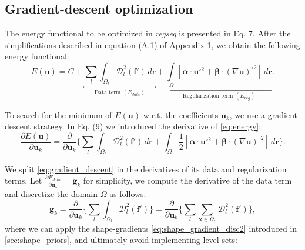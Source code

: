 \documentclass[a4paper]{report}
\providecommand{\mdist}[2]{ \mathcal{D}_{#2}^2(\mathbf{#1}) }
\renewcommand{\vec}[1]{\mathbf{#1}}
\begin{document}
\subsection{Gradient-descent optimization}\label{sec:gradient_descent}
The energy functional to be optimized in \emph{regseg} is presented in Eq. 7.
After the simplifications described in equation (A.1) of Appendix 1, we obtain the
  following energy functional:
  \begin{equation}
  E(\vec{u}) = C + \underbracket{\underset{l}{\sum} \int_{\Omega_l}
  \mdist{f'}{l} \,d\vec{r}}_{\text{Data term } (E_{data})}
  + \underbracket{\underset{\Omega}{\int} \left[ \boldsymbol{\alpha} \cdot \vec{u}^{\circ2}
  + \boldsymbol{\beta} \cdot (\nabla \vec{u})^{\circ2} \right] \,d\vec{r}}_{\text{Regularization term } (E_{reg})}.
  \label{eq:energy}
  \end{equation}

To search for the minimum of $E(\vec{u})$ w.r.t. the coefficients $\vec{u}_k$, we use a gradient descent strategy.
In Eq. (9) we introduced the derivative of \eqref{eq:energy}:
  \begin{equation}
  \frac{\partial E(\vec{u})}{\partial \vec{u}_k} =
  \frac{ \partial }{\partial \vec{u}_k} \Big\{
  \underset{l}{\sum} \int_{\Omega_l} \mdist{f'}{l} \,d\vec{r}
  + \int_{\Omega} \frac12 [ \boldsymbol{\alpha} \cdot \vec{u}^{\circ2}
  + \boldsymbol{\beta} \cdot (\nabla \vec{u})^{\circ2} ] \,d\vec{r}
  \Big\}.
  \label{eq:gradient_descent}
  \end{equation}

We split \eqref{eq:gradient_descent} in the derivatives of its data and regularization terms.
Let $\frac{\partial E_{data}}{\partial \vec{u}_k} = \vec{g}_k$ for simplicity, 
  we compute the derivative of the data term and discretize the domain $\Omega$ as follows:
\begin{equation}
  \vec{g}_k =
  \frac{ \partial }{\partial \vec{u}_k} \Big\{
  \underset{l}{\sum} \int_{\Omega_l} \mdist{f'}{l} \Big\} =
  \frac{ \partial }{\partial \vec{u}_k} \Big\{ \underset{l}{\sum} \underset{\vec{x} \in \Omega_l}{\sum} \, \mdist{f'}{l} \Big\},
  \label{eq:data_derivative}
\end{equation}
  where we can apply the shape-gradients \eqref{eq:shape_gradient_disc2} introduced
  in \autoref{sec:shape_priors}, and ultimately avoid implementing level sets:
\end{document}
